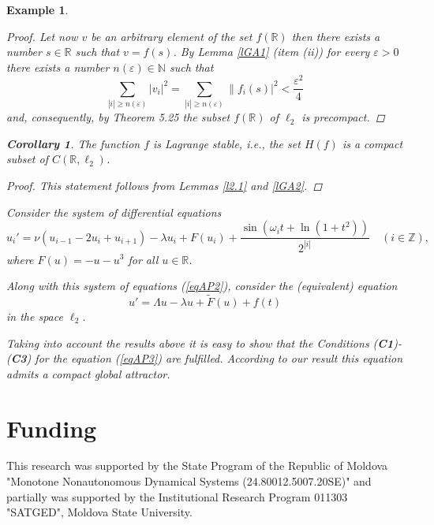 \documentclass{amsart}%
\newtheorem{coro}[lemma]{Corollary}
\newtheorem{example}[lemma]{Example}
\begin{document}
\begin{example}
\begin{proof}
Let now $v$ be an arbitrary element of the set $f(\mathbb R)$ then
there exists a number $s\in \mathbb R$ such that $v=f(s)$. By
Lemma \ref{lGA1} (item (ii)) for every $\varepsilon >0$ there
exists a number $n(\varepsilon)\in \mathbb N$ such that
\begin{equation}\label{eqGA9}
\sum\limits_{|i|\ge n(\varepsilon)}|v_i|^{2}= \sum\limits_{|i|\ge
n(\varepsilon)}\|f_i(s)|^{2}<\frac{\varepsilon^{2}}{4} \nonumber
\end{equation}
and, consequently, by Theorem 5.25 \cite[Ch.V,p.167]{LS_1974} the
subset $f(\mathbb R)$ of $\ell_{2}$ is precompact.
\end{proof}

\begin{coro}\label{corGA1} The function $f$ is Lagrange stable,
i.e., the set $H(f)$ is a compact subset of $C(\mathbb
R,\ell_{2})$.
\end{coro}
\begin{proof} This statement follows from Lemmas \ref{l2.1} and
\ref{lGA2}.
\end{proof}


Consider the system of differential equations
\begin{equation}\label{eqAP2}
u_{i}' = \nu (u_{i-1} - 2u_i + u_{i+1}) - \lambda u_{i} + F(u_i) +
\frac{\sin (\omega_{i} t +\ln(1+t^{2}))}{2^{|i|}} \quad (i \in
\mathbb{Z}),
\end{equation}
where $F(u) = -u - u^{3}$ for all $u \in \mathbb{R}$.

Along with this system of equations (\ref{eqAP2}), consider the
(equivalent) equation
\begin{equation}\label{eqAP3}
u' = \Lambda u - \lambda u + \tilde{F}(u) + f(t)
\end{equation}
in the space $\ell_{2}$.

Taking into account the results above it is easy to show that the
Conditions (\textbf{C1})-(\textbf{C3}) for the equation
(\ref{eqAP3}) are fulfilled. According to our result this equation
admits a compact global attractor.
\end{example}



\section{Funding}

This research was supported by the State Program of the Republic
of Moldova "Monotone Nonautonomous Dynamical Systems
(24.80012.5007.20SE)" and partially was supported by the
Institutional Research Program 011303 "SATGED", Moldova State
University.
\end{document}
